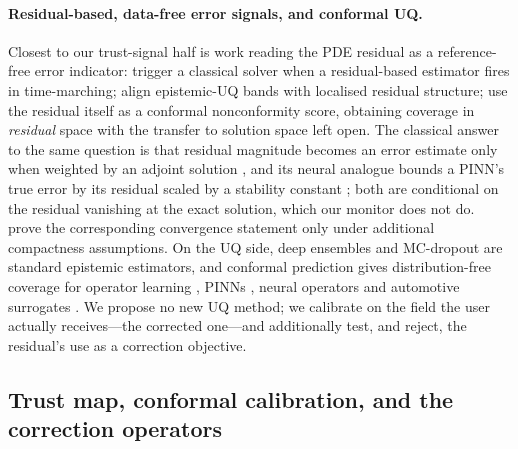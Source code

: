 \paragraph{Residual-based, data-free error signals, and conformal UQ.} Closest to our
trust-signal half is work reading the PDE residual as a reference-free error indicator:
\citet{roy2025anchor} trigger a classical solver when a residual-based estimator fires in
time-marching; \citet{song2026structureaware} align epistemic-UQ bands with localised
residual structure; \citet{gopakumar2025pre} use the residual itself as a conformal
nonconformity score, obtaining coverage in \emph{residual} space with the transfer to
solution space left open. The classical answer to the same question is that residual
magnitude becomes an error estimate only when weighted by an adjoint solution
\citep{beckerrannacher2001dwr}, and its neural analogue bounds a PINN's true error by its
residual scaled by a stability constant \citep{hillebrecht2025posteriori}; both are
conditional on the residual vanishing at the exact solution, which our monitor does not
do. \citet{mukherjee2026certification} prove the corresponding convergence statement only
under additional compactness assumptions. On the UQ side, deep ensembles
\citep{lakshminarayanan2017ensembles} and MC-dropout \citep{gal2016dropout} are standard
epistemic estimators, and conformal prediction gives distribution-free coverage for
operator learning \citep{ma2024uqno}, PINNs \citep{yu2026conformalpinn}, neural operators
\citep{garg2025dfuq} and automotive surrogates \citep{jia2026multigranularity}. We propose
no new UQ method; we calibrate on the field the user actually receives---the corrected
one---and additionally test, and reject, the residual's use as a correction objective.



\subsection{Trust map, conformal calibration, and the correction operators}
\label{sec:correction}

